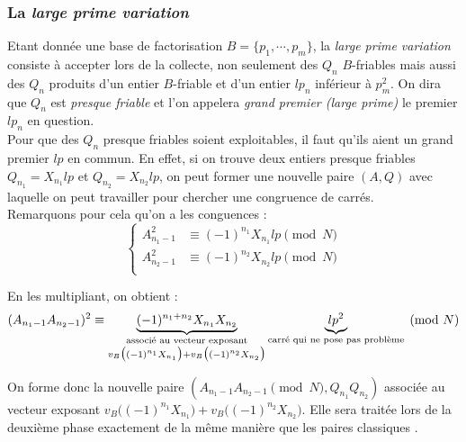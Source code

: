 \subsubsection{La \textit{large prime variation }}

Etant donnée une base de factorisation $B = \{ p_1, \cdots, p_m\}$, la \textit{large
prime variation } consiste à accepter lors de la collecte, non seulement des 
$Q_n$ $B$-friables mais aussi des $Q_n$ produits d'un entier $B$-friable et d'un
entier $lp_n$ inférieur à $p_m^2$. On dira que $Q_n$ est \emph{presque friable}
et l'on appelera \emph{grand premier (large prime)} le premier $lp_n$ en question. \\

Pour que des $Q_n$ presque friables soient exploitables, il faut qu'ils aient
un grand premier $lp$ en commun. En effet, si on trouve deux entiers presque
friables $Q_{n_1} = X_{n_1}lp $ et $Q_{n_2} =  X_{n_2}lp $, on peut former une
nouvelle paire $(A,Q)$ avec laquelle on peut travailler pour chercher une 
congruence de carrés. \\ 

Remarquons pour cela qu'on a les conguences :
\begin{equation*}
  \left\{
      \begin{aligned}
          A_{n_1 -1}^2 &\equiv (-1)^{n_1} X_{n_1}lp\pmod{N} \\
          A_{n_2 -1}^2 &\equiv (-1)^{n_2} X_{n_2}lp\pmod{N}\\
        \end{aligned}
    \right.
\end{equation*}

En les multipliant, on obtient : 
\[  (A_{n_1 -1} A_{n_2 -1})^2 \equiv 
     \underbrace{(-1)^{n_1 + n_2} X_{n_1} X_{n_2}}_
            {\begin{subarray}{c}\text{associé au vecteur exposant}\\
             v_{B} \big( (-1 )^{n_1} X_{n_1} \big)
             + v_{B} \big( (-1 )^{n_2} X_{n_2} \big) \end{subarray}
             }
    \underbrace{lp^2}_{\text{carré qui ne pose pas problème}}
    \pmod{N}
 \]
  
On forme donc la nouvelle paire $ (A_{n_1-1}A_{n_2 -1} \pmod{N}, Q_{n_1}Q_{n_2}) $
associée au vecteur exposant $v_{B} \big( (-1 )^{n_1} X_{n_1} \big)+
v_{B} \big( (-1 )^{n_2} X_{n_2} \big) $.  Elle sera traitée lors de la 
deuxième phase exactement de la même manière que les paires \og classiques \fg{}.\\


